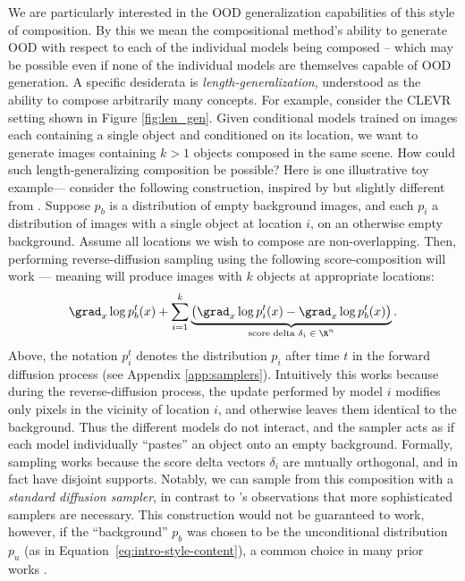 We are particularly interested in the OOD generalization capabilities of this style of composition. By this we mean the compositional method's ability to generate OOD with respect to each of the individual models being composed -- which may be possible even if none of the individual models are themselves capable of OOD generation.
A specific desiderata is \emph{length-generalization}, understood as the ability to compose arbitrarily many concepts.
For example, consider the CLEVR \citep{johnson2017clevr} setting shown in Figure \ref{fig:len_gen}.
Given conditional models trained on images each containing a single object
and conditioned on its location,
we want to generate images containing $k > 1$ objects composed in the same scene.
How could such length-generalizing composition be possible?
Here is one illustrative toy example---
consider the following construction, inspired by but slightly different from \citet{du2023reduce, liu2022compositional}.
Suppose $p_b$ is a distribution of empty background images,
and each $p_i$ a distribution of images with a single object at location $i$,
on an otherwise empty background. Assume all locations we wish to compose are non-overlapping.
Then, performing reverse-diffusion sampling using the following score-composition will work
--- meaning will produce images with $k$ objects at appropriate locations:
\begin{align}
    \label{eq:product_comp}
    \grad_x \log p^t_b(x)
    + \sum_{i=1}^k \underbrace{\left( \grad_x \log p^t_i(x) - \grad_x \log p^t_b(x) \right)}_{\textrm{score delta $\delta_i \in \R^n$}}.
\end{align}
Above, the notation $p_i^t$ denotes the
distribution $p_i$
after time $t$ in the forward diffusion
process (see Appendix \ref{app:samplers}).
Intuitively this works because during the reverse-diffusion process,
the update performed by model $i$
modifies only pixels in the vicinity of location $i$, and otherwise leaves them identical to the background.
Thus the different models do not interact, and the sampler acts as if each model individually ``pastes''
an object onto an empty background.
Formally, sampling works
because the score delta vectors $\delta_i$ are mutually orthogonal, and in fact have disjoint supports.
Notably, we can sample from this composition with 
a \emph{standard diffusion sampler}, in contrast to \citet{du2023reduce}'s observations that more sophisticated samplers are necessary.
This construction would not be guaranteed to work, however, if the ``background'' $p_b$
was chosen to be the unconditional distribution $p_u$
(as in Equation~\ref{eq:intro-style-content}),
a common choice in many prior works \citep{du2023reduce, liu2022compositional}.

